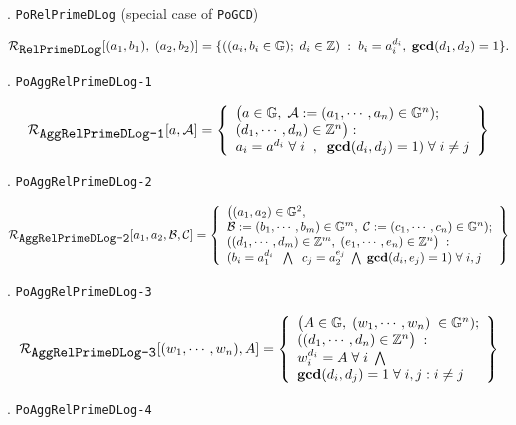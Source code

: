 \documentclass[11pt, lettersize, notitlepage, leqno, footskip=0.6cm]{article}
\newcommand{\bz}{\mathbb Z}
\newcommand{\mc}{\mathcal}
\newcommand{\mb}{\mathbb}
\newcommand{\mbf}{\mathbf}
\newcommand{\noin}{\noindent}
\newcommand{\GCD}{\mbf{gcd}}
\numberwithin{equation}{section}
\begin{document}
{\noin 9. \verb|PoRelPrimeDLog| (special case of \verb|PoGCD|) \vspace{-0.7cm}

\[
\mc{R}_{{\protect\verb|RelPrimeDLog|}}[(a_1,b_1),\;(a_2,b_2)] = \{((a_i, b_i\in\mb{G});\;d_i\in\bz)\;:\; b_i = a_i^{d_i},\;\GCD(d_1,d_2)=1 \} .
\]

\noin 10. \verb|PoAggRelPrimeDLog-1| \vspace{-0.2cm}

\[
  \mc{R}_{{\protect\verb|AggRelPrimeDLog-1|}}[a, \mc{A}] = \left\{\begin{array}{l}
    \big(a\in\mb{G},\;  \mc{A}:=(a_1,\cdots, a_n)\in\mb{G}^n);\\
    (d_1,\cdots,d_n)\in\bz^n\big): \\
    a_i = a^{d_i}\;\forall\;i\;\;,\;\; \GCD(d_i, d_j) = 1)\;\forall \;i\neq j   	
  \end{array}\right\}
\] 

\noin 11. \verb|PoAggRelPrimeDLog-2| \vspace{-0.6cm}

\[
  \mc{R}_{{\protect\verb|AggRelPrimeDLog-2|}}[a_1, a_2, \mc{B}, \mc{C}] = \left\{\begin{array}{l}
    \big((a_1,a_2)\in\mb{G}^2,\;\\
     \mc{B}:=(b_1,\cdots, b_m)\in\mb{G}^m,\;\mc{C}:= (c_1,\cdots, c_n)\in\mb{G}^n);\\
    ((d_1,\cdots,d_m)\in\bz^m,\; (e_1,\cdots,e_n)\in\bz^n\big)\;: \\
    (b_i = a_1^{d_i}\;\;\bigwedge\;\; c_j = a_2^{e_j}\;\bigwedge\; \GCD(d_i, e_j) = 1)\;\forall \;i,j   	
  \end{array}\right\}
\] 

\noin 12. \verb|PoAggRelPrimeDLog-3| \vspace{-0.3cm}

\[
  \mc{R}_{{\protect\verb|AggRelPrimeDLog-3|}}[(w_1,\cdots, w_n), A] = \left\{\begin{array}{l}
    \big(A\in\mb{G},\; (w_1,\cdots, w_n)\;\in\mb{G}^n);\\
    ((d_1,\cdots,d_n)\in\bz^n\big)\;: \\
    w_i^{d_i} = A\;\forall\;i\;\bigwedge  \\
   	\GCD(d_i, d_j) = 1\;\forall \;i,j: i\neq j
  \end{array}\right\}
\] 

\noin 13. \verb|PoAggRelPrimeDLog-4| \vspace{-0.7cm}

}
\end{document}
